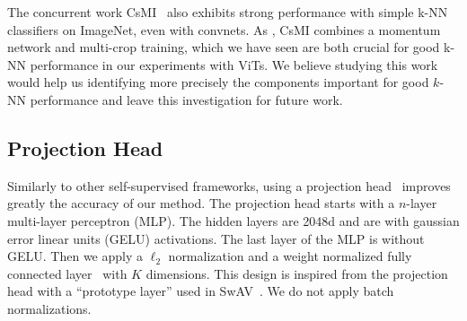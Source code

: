 The concurrent work CsMI~\cite{xu2021seed} also exhibits strong performance with simple k-NN classifiers on ImageNet, even with convnets.
As \OURS, CsMI combines a momentum network and multi-crop training, which we have seen are both crucial for good k-NN performance in our experiments with ViTs.
We believe studying this work would help us identifying more precisely the components important for good $k$-NN performance and leave this investigation for future work.

\subsection{Projection Head}
\label{ap:projhead}
Similarly to other self-supervised frameworks, using a projection head~\cite{chen2020simple} improves greatly the accuracy of our method.
The projection head starts with a $n$-layer multi-layer perceptron (MLP).
The hidden layers are 2048d and are with gaussian error linear units (GELU) activations.
The last layer of the MLP is without GELU.
Then we apply a $\ell_2$ normalization and a weight normalized fully connected layer~\cite{chen2020exploring,salimans2016weight} with $K$ dimensions.
This design is inspired from the projection head with a ``prototype layer'' used in SwAV~\cite{caron2020unsupervised}.
We do not apply batch normalizations.

